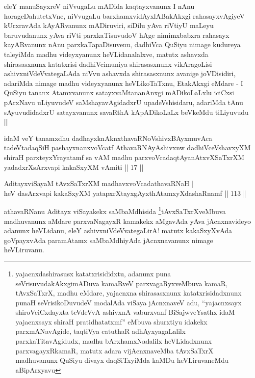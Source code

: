 \begin{artha}
eleY manuSayxreV niVvugaLu mADida kaqtayxvanunx I nAnu
horageDahutetxVne, niVvugaLu barxhamxvidAyxlABakAkxgi rahasayxvAgiyeV
kUrxravAda kAyARvanunx mADiruviri, siDilu yAva riVtiyU maLeyu
baruvudanunx yAva riVti parxkaTisuvudoV hAge nimimxbabxra rahasayx
kayARvanunx nAnu parxkaTapaDisuvenu, dadhiVca QuSiyu nimage kudureya
taleyiMda madhu videyxyanunx heVLidanalalxve, matutx ashavxda
shirasasxnunx katatxrisi dadhiVcimuniya shirasasxnunx vikAragoLisi
ashivxniVdeVvategaLAda niVvu ashavxda shirasasxnunx avanige
joVDisidiri, adariMda nimage madhu videyxyanunx heVLikoTaTxnu,
EtakAkxgi eMdare - I QuSiyu tananx Atamxvanunx satayxvaMtananAnxgi
mADikoLaLxlu iciCxsi pArxNavu uLiyuvudeV saMshayavAgidadxrU
upadeVshisidaru, adariMda tAnu sAyuvudidadxrU satayxvanunx savaRthA
kApADikoLaLx beVkeMdu tiLiyuvudu ||
\end{artha}

\centerline{}

\begin{shl}
idaM veY tanamxdhu dadhayxknAknxthavaRNoV\s shivxBAyxmuvAca tadeVtadaqSiH pashayxnanxvoVcatf AthavaRNAyAshivxnw dadhiVceV\s shavxyXM shiraH parxteyxYrayatamf sa vAM madhu parxvoVcadaqtAyanAtxvXSaTxrXM yadadxrXsArxvapi kakaSxyXM vAmiti || 17 ||
\end{shl}


\begin{shl}
AditayxviSayaM tAvxSaTxrXM madhavxvoVcadathavaRNaH |\\
heV dasArxvapi kakaSxyXM yatapxrXtayxgAyxthAtamxyXdashaRnamf \hfill || 113 ||
\end{shl}

\begin{artha}
athavaRNanu Aditayx viSayakekx
saMbaMdhisida \footnote[1]{yajacnxdashirasusx katatxrisididxtu,
  adanunx puna seVrisuvudakAkxgimADuva kamaRveV parxvagaRyxveMbuva
  kamaR, tAvxSaTxrX, madhu eMdare, yajacnxna shirasasxnunx
  katatxrisidadxnunx punaH seVrisikoDuvudeV modalAda viSaya
  jAcnxnaveV adu, ``yajacnxsayx shiroV\s ciCxdayxta teVdeVvA ashivxnA vaburxvanf BiSajwveYsathx idaM yajacnxsayx shiraH pratidhatatxmf'' eMbuva shurxtiyu idakekx parxmANavAgide,
  taqtiVya catuthaR adhAyxyagaLalilx parxkaTitavAgidudx, madhu
  bArxhamxNadalilx heVLidadxnunx parxvagayxRkamaR, matutx adara
  vijAcnxnaveMba tAvxSaTxrX madhuvanunx QuSiyu divayx daqSiTxyiMda
  kaMDu heVLiruvaneMdu aBipArxyavu}tAvxSaTxrXveMbuva madhuvanunx  aMdare
parxvaNagayxR kamakekx aMgavAda yAva jAcnxnavideyo adanunx heVLidanu,
eleY ashivxniVdeVvategaLirA! matutx kakaSxyXvAda goVpayxvAda
paramAtamx saMbaMdhiyAda jAcnxnavanunx nimage heVLiruvanu.
\end{artha}

